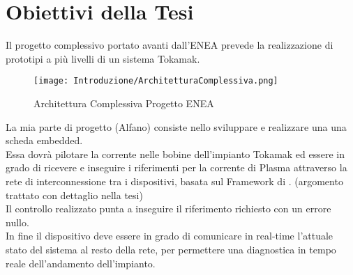 \section*{Obiettivi della Tesi}
Il progetto complessivo portato avanti dall'ENEA prevede la realizzazione di prototipi a più livelli di un sistema Tokamak.\vspace{-4mm}
\begin{figure}[H]
	\centering
	\caption[Architettura Complessiva Progetto ENEA]{Architettura Complessiva Progetto ENEA}
	\texttt{[image: Introduzione/ArchitetturaComplessiva.png]}
\end{figure}\vspace{-8mm}
\noindent
La mia parte di progetto ({\color{red}Alfano}) consiste nello sviluppare e realizzare una una scheda embedded.\\
Essa dovrà pilotare la corrente nelle bobine dell'impianto Tokamak ed essere in grado di ricevere e inseguire i riferimenti per la corrente di Plasma attraverso la rete di interconnessione tra i dispositivi, basata sul Framework di \MARTe. (argomento trattato con dettaglio nella tesi)\\
Il controllo realizzato punta a inseguire il riferimento richiesto con un errore nullo.\\
In fine il dispositivo deve essere in grado di comunicare in real-time l'attuale stato del sistema al resto della rete, per permettere una diagnostica in tempo reale dell'andamento dell'impianto.\\